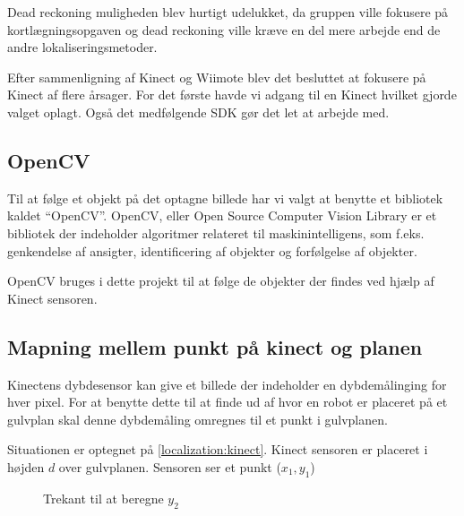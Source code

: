 Dead reckoning muligheden blev hurtigt udelukket, da gruppen ville fokusere på kortlægningsopgaven og dead reckoning ville kræve en del mere arbejde end de andre lokaliseringsmetoder.

Efter sammenligning af Kinect og Wiimote blev det besluttet at fokusere på Kinect af flere årsager.
For det første havde vi adgang til en Kinect hvilket gjorde valget oplagt. 
Også det medfølgende SDK gør det let at arbejde med.

\subsection{OpenCV}
Til at følge et objekt på det optagne billede har vi valgt at benytte et bibliotek kaldet ``OpenCV''.
OpenCV, eller Open Source Computer Vision Library er et bibliotek der indeholder algoritmer relateret til maskinintelligens, som f.eks. genkendelse af ansigter, identificering af objekter og forfølgelse af objekter.\cite{opencv}

OpenCV bruges i dette projekt til at følge de objekter der findes ved hjælp af Kinect sensoren.

\clearpage
\subsection{Mapning mellem punkt på kinect og planen}

Kinectens dybdesensor kan give et billede der indeholder en dybdemålinging for hver pixel. 
For at benytte dette til at finde ud af hvor en robot er placeret på et gulvplan skal denne dybdemåling omregnes til et punkt i gulvplanen.

Situationen er optegnet på \cref{localization:kinect}.
Kinect sensoren er placeret i højden $ d $ over gulvplanen. 
Sensoren ser et punkt ($ x_1,y_1 $)

\begin{figure}
\caption{Trekant til at beregne $ y_2 $}
\label{localization:trekant}
\end{figure}

